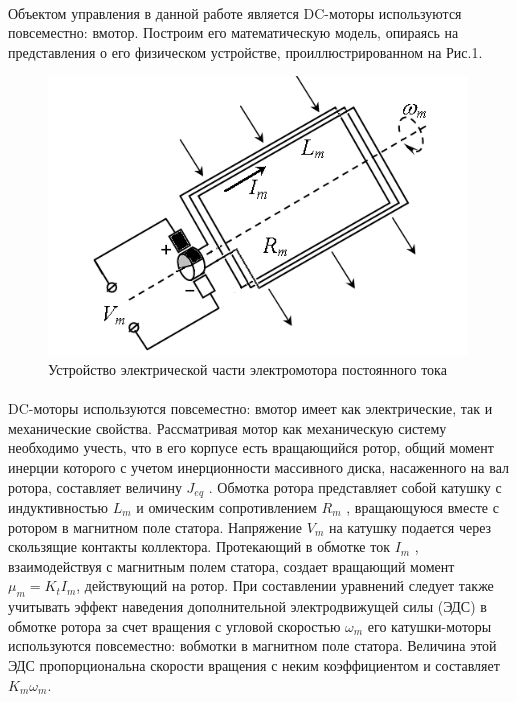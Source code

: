 \documentclass[12pt]{article}
\begin{document}
\paragraph{}
Объектом управления в данной работе является DC-моторы используются повсеместно: вмотор.
Построим его математическую модель, опираясь на
представления о его физическом устройстве,
проиллюстрированном на Рис.1.

\begin{figure}[h]
	\centering
	\includegraphics[scale=0.5]{motorabstract}
	\caption[0.5\textwidth]{Устройство электрической части электромотора постоянного тока}
\end{figure}

\paragraph{}
DC-моторы используются повсеместно: вмотор имеет как электрические, так и механические
свойства. Рассматривая мотор как механическую систему
необходимо учесть, что в его корпусе есть вращающийся
ротор, общий момент инерции которого с учетом
инерционности массивного диска, насаженного на вал
ротора, составляет величину $J_{eq}$ . Обмотка ротора
представляет собой катушку с индуктивностью $L_m$ и
омическим сопротивлением $R_m$ , вращающуюся вместе с
ротором в магнитном поле статора. Напряжение $V_m$ на
катушку подается через скользящие контакты коллектора.
Протекающий в обмотке ток $I_m$ , взаимодействуя с
магнитным полем статора, создает вращающий момент $\mu_m = K_tI_m$, действующий на ротор. При составлении уравнений
следует также учитывать эффект наведения дополнительной
электродвижущей силы (ЭДС) в обмотке ротора за счет
вращения с угловой скоростью $\omega_m$ его катушки-моторы используются повсеместно: вобмотки в
магнитном поле статора. Величина этой ЭДС
пропорциональна скорости вращения с неким
коэффициентом и составляет $K_m \omega_m$.
\end{document}
